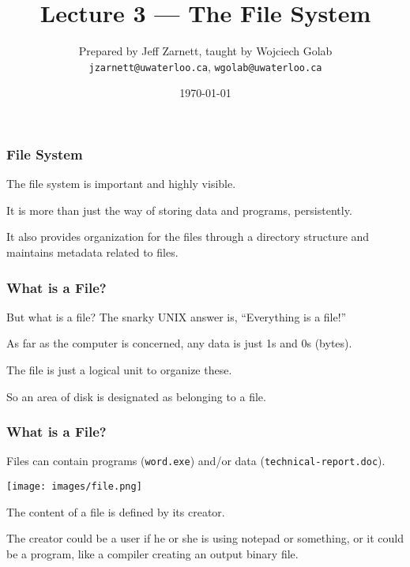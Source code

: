 

\title{Lecture 3 --- The File System }

\author{Prepared by Jeff Zarnett, taught by Wojciech Golab \\ \small \texttt{jzarnett@uwaterloo.ca}, \texttt{wgolab@uwaterloo.ca}}
\date{\today}




\begin{frame}
	\titlepage

\end{frame}



\begin{frame}
	\frametitle{File System}

	The file system is important and highly visible.

	It is more than just the way of storing data and programs, persistently.

	It also provides organization for the files through a directory structure and maintains metadata related to files.

\end{frame}

\begin{frame}
	\frametitle{What is a File?}

	But what is a file? The snarky UNIX answer is, ``Everything is a file!''

	As far as the computer is concerned, any data is just 1s and 0s (bytes).

	The file is just a logical unit to organize these.

	So an area of disk is designated as belonging to a file.

\end{frame}

\begin{frame}
	\frametitle{What is a File?}

	Files can contain programs (\texttt{word.exe}) and/or data (\texttt{technical-report.doc}).

	\begin{center}
		\texttt{[image: images/file.png]}
	\end{center}

	The content of a file is defined by its creator.

	The creator could be a user if he or she is using notepad or something, or it could be a program, like a compiler creating an output binary file.

\end{frame}

